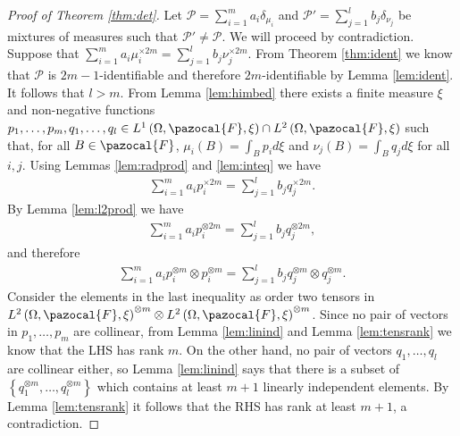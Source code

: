 \documentclass[aos,preprint]{imsart}
\def\sF{\pazocal{F}}
\def\sP{\mathscr{P}}
\theoremstyle{plain}
\theoremstyle{defintion}
\begin{document}
	\begin{proof}[Proof of Theorem \ref{thm:det}]
		Let $\sP = \sum_{i=1}^m a_i \delta_{\mu_i}$ and $\sP' = \sum_{j=1}^{l}  b_j \delta_{\nu_j}$ be mixtures of measures such that $\sP' \neq \sP$. We will proceed by contradiction. Suppose that $\sum_{i=1}^m  a_i \mu_i^{\times 2m} = \sum_{j=1}^l b_j \nu_j^{\times 2m} $. From Theorem \ref{thm:ident} we know that $\sP$ is $2m-1$-identifiable and therefore $2m$-identifiable by Lemma \ref{lem:ident}. It follows that $l>m$. From Lemma \ref{lem:himbed} there exists a finite measure $\xi$ and non-negative functions $p_1,\ldots,p_m,q_1,\ldots,q_l \in L^1\left( \Omega, \sF, \xi \right)\cap L^2\left( \Omega, \sF, \xi \right)$ such that, for all $B\in \sF$, $\mu_i(B) = \int_B p_i d\xi$ and $\nu_j(B) = \int_B q_j d\xi$ for all $i,j$. Using Lemmas \ref{lem:radprod} and \ref{lem:inteq} we have
		\begin{eqnarray*}
			\sum_{i=1}^m a_i p_i^{\times 2m} = \sum_{j=1}^l b_j q_j^{\times 2m}.
		\end{eqnarray*}
		By Lemma \ref{lem:l2prod} we have
		\begin{eqnarray*}
			\sum_{i=1}^m a_i p_i^{\otimes 2m} = \sum_{j=1}^l b_j q_j^{\otimes 2m},
		\end{eqnarray*}
		and therefore
		\begin{eqnarray*}
			\sum_{i=1}^m a_i p_i^{\otimes m}\otimes p_i^{\otimes m} = \sum_{j=1}^l b_j q_j^{\otimes m}\otimes q_j^{\otimes m}.
		\end{eqnarray*}
		\sloppy Consider the elements in the last inequality as order two tensors in $ {L^2\left( \Omega, \sF, \xi \right)}^{\otimes m} \otimes  {L^2\left( \Omega, \sF, \xi \right)}^{ \otimes m} $. Since no pair of vectors in $p_1,\ldots,p_m$ are collinear, from Lemma \ref{lem:linind} and Lemma \ref{lem:tensrank} we know that the LHS has rank $m$. On the other hand, no pair of vectors $q_1,\ldots,q_l$ are collinear either, so Lemma \ref{lem:linind} says that there is a subset of $\left\{q_1^{\otimes m},\ldots, q_l^{\otimes m}\right\}$ which contains at least $m+1$ linearly independent elements. By Lemma \ref{lem:tensrank} it follows that the RHS has rank at least $m+1$, a contradiction.
	\end{proof}
\end{document}
